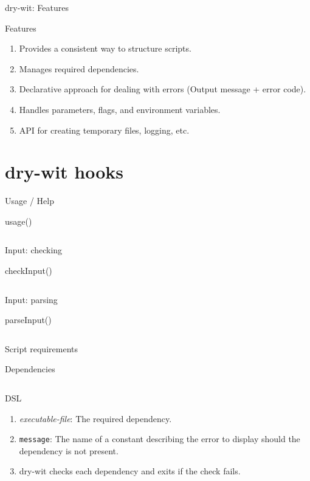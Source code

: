 \documentclass{beamer}
\begin{document}
\begin{frame}{dry-wit: Features}
  \begin{block}{Features}
    \begin{enumerate}
    \item Provides a consistent way to structure scripts.
    \item Manages required dependencies.
    \item Declarative approach for dealing with errors (Output message + error code).
    \item Handles parameters, flags, and environment variables.
    \item API for creating temporary files, logging, etc.
    \end{enumerate}
  \end{block}
\end{frame}

\section{dry-wit hooks}

\begin{frame}[fragile]{Usage / Help}
  \begin{block}{usage()}
    \inputminted{bash}{usage.bash}
  \end{block}
\end{frame}

\begin{frame}[fragile]{Input: checking}
  \begin{block}{checkInput()}
    \inputminted{bash}{checkinput.bash}
  \end{block}
\end{frame}

\begin{frame}[fragile]{Input: parsing}
  \begin{block}{parseInput()}
    \inputminted{bash}{parseinput.bash}
  \end{block}
\end{frame}

\begin{frame}[fragile]{Script requirements}
  \begin{block}{Dependencies}
    \inputminted{bash}{checkrequirements.bash}
  \end{block}
  \begin{block}{DSL}
    \begin{enumerate}
    \item \textit{executable-file}: The required dependency.
    \item \texttt{message}: The name of a constant describing the error to display should the dependency is not present.
    \item dry-wit checks each dependency and exits if the check fails.
    \end{enumerate}
  \end{block}
\end{frame}
\end{document}
